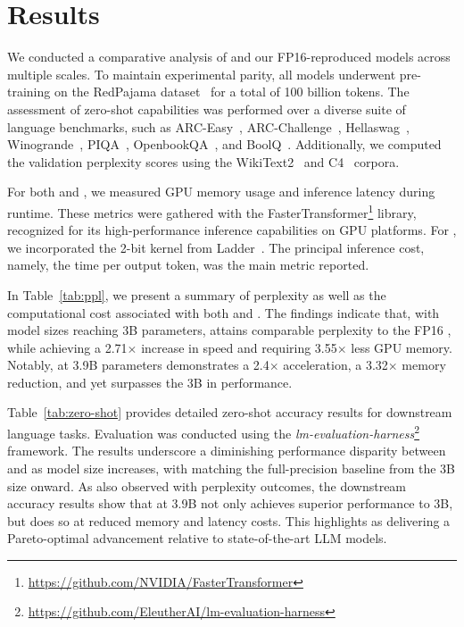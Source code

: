 \section{Results}

We conducted a comparative analysis of  and our FP16-reproduced  models across multiple scales. To maintain experimental parity, all models underwent pre-training on the RedPajama dataset~\cite{redpajama} for a total of 100 billion tokens. The assessment of zero-shot capabilities was performed over a diverse suite of language benchmarks, such as ARC-Easy~\cite{arc}, ARC-Challenge~\cite{arc}, Hellaswag~\cite{hellaswag}, Winogrande~\cite{winoGrande}, PIQA~\cite{piqa}, OpenbookQA~\cite{openbookqa}, and BoolQ~\cite{boolq}. Additionally, we computed the validation perplexity scores using the WikiText2~\cite{wikitext2} and C4~\cite{c4} corpora.

For both  and , we measured GPU memory usage and inference latency during runtime. These metrics were gathered with the FasterTransformer\footnote{\url{https://github.com/NVIDIA/FasterTransformer}} library, recognized for its high-performance inference capabilities on GPU platforms. For , we incorporated the 2-bit kernel from Ladder~\cite{ladder}. The principal inference cost, namely, the time per output token, was the main metric reported.

In Table~\ref{tab:ppl}, we present a summary of perplexity as well as the computational cost associated with both  and . The findings indicate that, with model sizes reaching 3B parameters,  attains comparable perplexity to the FP16 , while achieving a 2.71$\times$ increase in speed and requiring 3.55$\times$ less GPU memory. Notably,  at 3.9B parameters demonstrates a 2.4$\times$ acceleration, a 3.32$\times$ memory reduction, and yet surpasses the  3B in performance.

Table~\ref{tab:zero-shot} provides detailed zero-shot accuracy results for downstream language tasks. Evaluation was conducted using the \emph{lm-evaluation-harness}\footnote{\url{https://github.com/EleutherAI/lm-evaluation-harness}} framework. The results underscore a diminishing performance disparity between  and  as model size increases, with  matching the full-precision baseline from the 3B size onward. As also observed with perplexity outcomes, the downstream accuracy results show that  at 3.9B not only achieves superior performance to  3B, but does so at reduced memory and latency costs. This highlights  as delivering a Pareto-optimal advancement relative to state-of-the-art LLM models.

